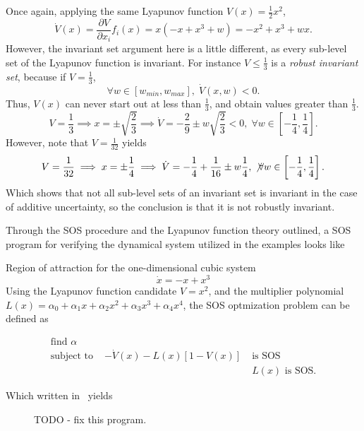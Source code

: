 Once again, applying the same Lyapunov function \(V(x) = \frac{1}{2}x^2\),
\[
  \dot{V}(x) = \frac{\partial V}{\partial x_i} f_i(x) = x(-x + x^3 + w) = -x^2 +
  x^3 + wx.
\]
However, the invariant set argument here is a little different, as every
sub-level set of the Lyapunov function is invariant. For instance \(V \leq
\frac{1}{3}\) is a \textit{robust invariant set}, because if \(V =
\frac{1}{3}\),
\[
  \forall w \in \left[ w_{min}, w_{max} \right], \; \dot{V}(x,w) < 0.
\]
Thus, \(V(x)\) can never start out at less than \(\frac{1}{3}\), and obtain
values greater than \(\frac{1}{3}\).
\[
  V = \frac{1}{3} \implies x = \pm \sqrt{\frac{2}{3}} \implies \dot{V} =
  -\frac{2}{9} \pm w \sqrt{\frac{2}{3}} < 0, \; \forall w \in \left[
    -\frac{1}{4}, \frac{1}{4} \right].
\]
However, note that \(V = \frac{1}{32}\) yields
\[
  V = \frac{1}{32} \implies x = \pm \frac{1}{4} \implies \dot{V} = -\frac{1}{4}
  + \frac{1}{16} \pm w\frac{1}{4}, \; \not \forall w \in \left[ -\frac{1}{4},
    \frac{1}{4} \right].
\]
Which shows that not all sub-level sets of an invariant set is invariant in the
case of additive uncertainty, so the conclusion is that it is not robustly
invariant.

Through the \ac{SOS} procedure and the Lyapunov function theory outlined, a
\ac{SOS} program for verifying the dynamical system utilized in the examples
looks like
\begin{example}{Region of attraction for the one-dimensional cubic system}
  \[
    \dot{x} = -x + x^3
  \]
  Using the Lyapunov function candidate \(V = x^2\), and the multiplier
  polynomial \(L(x) = \alpha_0 + \alpha_1x + \alpha_2x^2 + \alpha_3x^3 +
  \alpha_4x^4\), the \ac{SOS} optmization problem can be defined as

\begin{align*}
  \text{find } \alpha& \\
  \text{subject to }& -\dot{V}(x) - L(x)\left[ 1 - V(x) \right] \; &\text{is SOS} \\
                     & &L(x) \text{ is SOS}.
\end{align*}

Which written in~\cite[Yalmip]{Lofberg2004,Lofberg2009} yields

\begin{figure}


\caption{TODO - fix this program.}
\end{figure}
\end{example}

